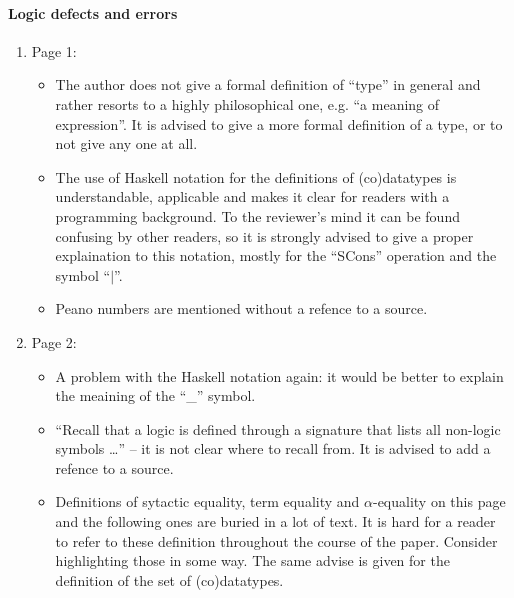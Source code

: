 \paragraph{Logic defects and errors}
\begin{enumerate}
	\item Page 1:
	\begin{itemize}
		\item The author does not give a formal definition of ``type'' in general and rather resorts to a highly philosophical one, e.g. ``a meaning of expression''. It is advised to give a more formal definition of a type, or to not give any one at all.
		\item The use of Haskell notation for the definitions of (co)datatypes is understandable, applicable and makes it clear for readers with a programming background. To the reviewer's mind it can be found confusing by other readers, so it is strongly advised to give a proper explaination to this notation, mostly for the ``SCons'' operation and the symbol ``$|$''.
		\item Peano numbers are mentioned without a refence to a source.
	\end{itemize} 

	\item Page 2:
	\begin{itemize}
		\item A problem with the Haskell notation again: it would be better to explain the meaining of the ``\_'' symbol.
		\item ``Recall that a logic is deﬁned through a signature that lists all non-logic symbols \dots'' -- it is not clear where to recall from. It is advised to add a refence to a source.
		\item Definitions of sytactic equality, term equality and $\alpha$-equality on this page and the following ones are buried in a lot of text. It is hard for a reader to refer to these definition throughout the course of the paper. Consider highlighting those in some way. The same advise is given for the definition of the set of (co)datatypes.
	\end{itemize}


\end{enumerate}
